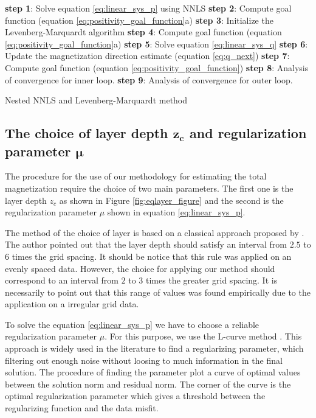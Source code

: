 \begin{algorithm}[H]
	
	{ \textbf{step 1}: Solve equation \ref{eq:linear_sys_p} using NNLS \;
	  \textbf{step 2}: Compute goal function (equation \ref{eq:positivity_goal_function}a) \; 
		{ \textbf{step 3}:  Initialize the Levenberg-Marquardt algorithm \;  
		  \textbf{step 4}: Compute goal function (equation \ref{eq:positivity_goal_function}a)\;
			 {
				\textbf{step 5}:  Solve equation \ref{eq:linear_sys_q} \;
				\textbf{step 6}:  Update the magnetization direction estimate (equation \ref{eq:q_next}) \;
				\textbf{step 7}: Compute goal function (equation \ref{eq:positivity_goal_function})\;
			}
			\textbf{step 8}:  Analysis of convergence for inner loop.}
			\textbf{step 9}:  Analysis of convergence for outer loop.}
		
		\caption{Nested NNLS and Levenberg-Marquardt method}
		\label{cd: LM_NNLS}
	\end{algorithm}

\subsection{The choice of layer depth $\mathbf{z_c}$ and regularization parameter $\mathbf{\mu}$}

The procedure for the use of our methodology for estimating the total magnetization require the choice of two main parameters. The first one is the layer depth $z_c$ as shown in Figure \ref{fig:eqlayer_figure} and the second is the regularization parameter $\mu$ shown in equation \ref{eq:linear_sys_p}.

The method of the choice of layer is based on a classical approach proposed by \cite{dampney1969}. The author pointed out that the layer depth should satisfy an interval from $2.5$ to $6$ times the grid spacing. It should be notice that this rule was applied on an evenly spaced data. However, the choice for applying our method should correspond to an interval from $2$ to $3$ times the greater grid spacing. It is necessarily to point out that this range of values was found empirically due to the application on a irregular grid data.

To solve the equation \ref{eq:linear_sys_p} we have to choose a reliable regularization parameter $\mu$. For this purpose, we use the L-curve method \citep{hansen1992}. This approach is widely used in the literature to find a regularizing parameter, which filtering out enough noise without loosing to much information in the final solution. The procedure of finding the parameter plot a curve of optimal values between the solution norm and residual norm. The corner of the curve is the optimal regularization parameter which gives a threshold between the regularizing function and the data misfit.
